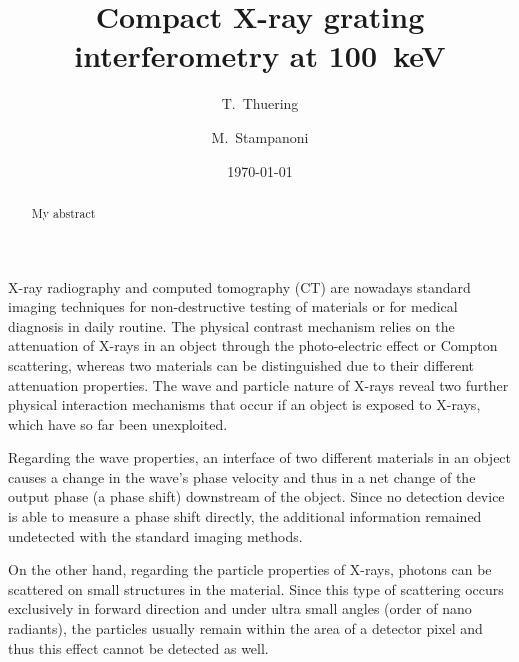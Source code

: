 \documentclass[aps,prl,floatfix,twocolumn,10pt]{revtex4-1}  %
\begin{document}
\title{Compact X-ray grating interferometry at 100~keV}

\author{T.~Thuering}

\author{M.~Stampanoni}

\date{\today}


\begin{abstract}
My abstract
\end{abstract}

\maketitle






X-ray radiography and computed tomography (CT) are nowadays standard imaging techniques for non-destructive testing of materials or for medical diagnosis in daily routine. The physical contrast mechanism relies on the attenuation of X-rays in an object through the photo-electric effect or Compton scattering, whereas two materials can be distinguished due to their different attenuation properties. The wave and particle nature of X-rays reveal two further physical interaction mechanisms that occur if an object is exposed to X-rays, which have so far been unexploited.

Regarding the wave properties, an interface of two different materials in an object causes a change in the wave's phase velocity and thus in a net change of the output phase (a phase shift) downstream of the object. Since no detection device is able to measure a phase shift directly, the additional information remained undetected with the standard imaging methods.

On the other hand, regarding the particle properties of X-rays, photons can be scattered on small structures in the material. Since this type of scattering occurs exclusively in forward direction and under ultra small angles (order of nano radiants), the particles usually remain within the area of a detector pixel and thus this effect cannot be detected as well.
\end{document}
